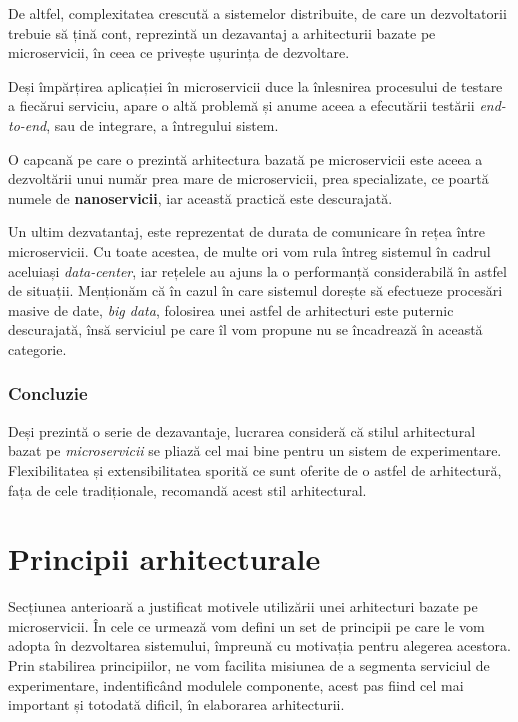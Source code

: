 De altfel, complexitatea crescută a sistemelor distribuite, de care un dezvoltatorii trebuie să țină cont, reprezintă un dezavantaj a arhitecturii bazate pe microservicii, în ceea ce privește ușurința de dezvoltare. 

Deși împărțirea aplicației în microservicii duce la înlesnirea procesului de testare a fiecărui serviciu, apare o altă problemă și anume aceea a efecutării testării \textit{end-to-end}, sau de integrare, a întregului sistem. 

\begin{remark}
	O capcană pe care o prezintă arhitectura bazată pe microservicii este aceea a dezvoltării unui număr prea mare de microservicii, prea specializate, ce poartă numele de \textbf{nanoservicii}, iar această practică este descurajată.
\end{remark}

Un ultim dezvatantaj, este reprezentat de durata de comunicare în rețea între microservicii. Cu toate acestea, de multe ori vom rula întreg sistemul în cadrul aceluiași \textit{data-center}, iar rețelele au ajuns la o performanță considerabilă în astfel de situații. Menționăm că în cazul în care sistemul dorește să efectueze procesări masive de date, \textit{big data}, folosirea unei astfel de arhitecturi este puternic descurajată, însă serviciul pe care îl vom propune nu se încadrează în această categorie.

\subsubsection{Concluzie}

Deși prezintă o serie de dezavantaje, lucrarea consideră că stilul arhitectural bazat pe \textit{microservicii} se pliază cel mai bine pentru un sistem de experimentare. Flexibilitatea și extensibilitatea sporită ce sunt oferite de o astfel de arhitectură, fața de cele tradiționale, recomandă acest stil arhitectural.

\section{Principii arhitecturale}

Secțiunea anterioară a justificat motivele utilizării unei arhitecturi bazate pe microservicii. În cele ce urmează vom defini un set de principii pe care le vom adopta în dezvoltarea sistemului, împreună cu motivația pentru alegerea acestora. Prin stabilirea principiilor, ne vom facilita misiunea de a segmenta serviciul de experimentare, indentificând modulele componente, acest pas fiind cel mai important și totodată dificil, în elaborarea arhitecturii.

